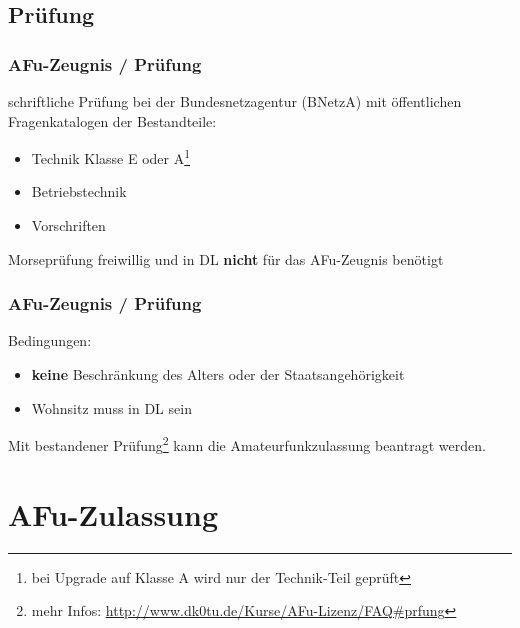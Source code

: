 \subsection{Prüfung}

\begin{frame}
    \frametitle{AFu-Zeugnis / Prüfung}

    schriftliche Prüfung bei der Bundesnetzagentur (BNetzA) mit öffentlichen
    Fragenkatalogen der Bestandteile:

    \begin{itemize}
        \item Technik Klasse E oder A\footnote{bei Upgrade auf Klasse A wird nur
              der Technik-Teil geprüft}
        \item Betriebstechnik
        \item Vorschriften
    \end{itemize}

    \vspace{2em}

    Morseprüfung freiwillig und in DL \textbf{nicht} für das AFu-Zeugnis benötigt

\end{frame}

\begin{frame}
    \frametitle{AFu-Zeugnis / Prüfung}

    Bedingungen:

    \begin{itemize}
        \item \textbf{keine} Beschränkung des Alters oder der Staatsangehörigkeit
        \item Wohnsitz muss in DL sein
    \end{itemize}

    Mit bestandener Prüfung\footnote{mehr Infos: \scriptsize
    \url{http://www.dk0tu.de/Kurse/AFu-Lizenz/FAQ\#prfung}} kann die
    Amateurfunkzulassung beantragt werden.

\end{frame}

\section{AFu-Zulassung}

